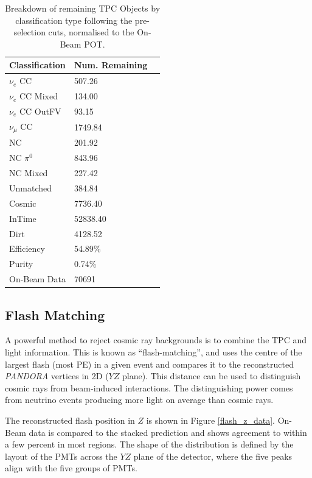 \begin{table}[htbp]
\center
\begin{tabular}{l | l l }
Classification & Num. Remaining \\
\hline
$\nu_e$ CC & 507.26 \\
$\nu_e$ CC Mixed & 134.00 \\
$\nu_e$ CC OutFV & 93.15 \\
$\nu_{\mu}$ CC & 1749.84\\
NC & 201.92 \\
NC $\pi^0$ & 843.96 \\
NC Mixed & 227.42 \\
Unmatched & 384.84 \\
Cosmic & 7736.40 \\
InTime & 52838.40 \\
Dirt &4128.52 \\
\hline
\hline
Efficiency & 54.89\%\\
Purity & 0.74\%\\
\hline
On-Beam Data & 70691\\
\hline
\end{tabular}
\caption{Breakdown of remaining TPC Objects by classification type following the pre-selection cuts, normalised to the On-Beam POT.}\label{selection_summary_table_fv}
\end{table}

\FloatBarrier
\subsection{Flash Matching}

A powerful method to reject cosmic ray backgrounds is to combine the TPC and light information. This is known as ``flash-matching'', and uses the centre of the largest flash (most PE) in a given event and compares it to the reconstructed \textit{PANDORA} vertices in 2D ($YZ$ plane). This distance can be used to distinguish cosmic rays from beam-induced interactions. The distinguishing power comes from neutrino events producing more light on average than cosmic rays.

The reconstructed flash position in $Z$ is shown in Figure \ref{flash_z_data}. On-Beam data is compared to the stacked prediction and shows agreement to within a few percent in most regions. The shape of the distribution is defined by the layout of the PMTs across the $YZ$ plane of the detector, where the five peaks align with the five groups of PMTs.

